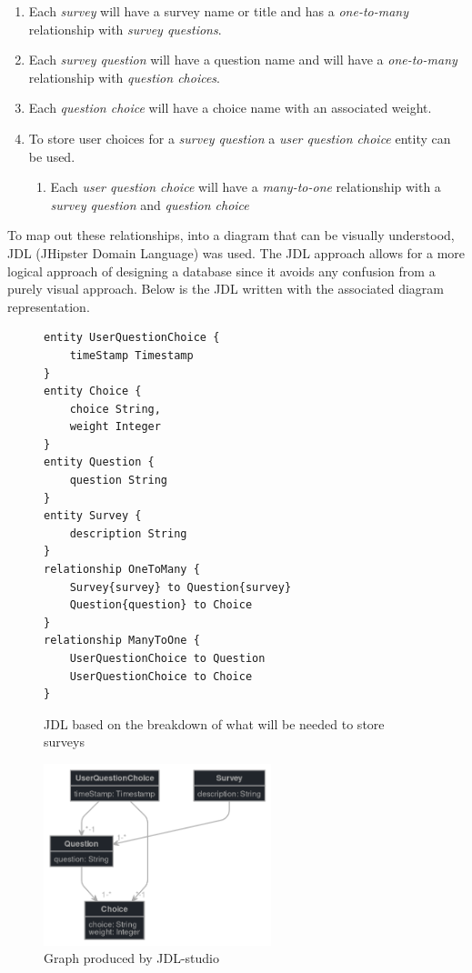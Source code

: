 \begin{enumerate}
    \item Each \textit{survey} will have a survey name or title and has a \textit{one-to-many} relationship with \textit{survey questions}.
    \item Each \textit{survey question} will have a question name and will have a \textit{one-to-many} relationship with \textit{question choices}.
    \item Each \textit{question choice} will have a choice name with an associated weight.
    \item To store user choices for a \textit{survey question} a \textit{user question choice} entity can be used.
        \begin{enumerate}
            \item Each \textit{user question choice} will have a \textit{many-to-one} relationship with a \textit{survey question} and \textit{question choice}
        \end{enumerate}
\end{enumerate}

To map out these relationships, into a diagram that can be visually understood, JDL (JHipster Domain Language) was used.
The JDL approach allows for a more logical approach of designing a database since it avoids any confusion from a purely visual approach.
Below is the JDL written with the associated diagram representation.

\begin{figure}[ht]
    \centering
    \begin{lstlisting}[language=JDL]
entity UserQuestionChoice {
	timeStamp Timestamp
}
entity Choice {
	choice String,
    weight Integer
}
entity Question {
	question String
}
entity Survey {
	description String
}
relationship OneToMany {
    Survey{survey} to Question{survey}
	Question{question} to Choice
}
relationship ManyToOne {
    UserQuestionChoice to Question
    UserQuestionChoice to Choice
}
    \end{lstlisting}
    \caption{JDL based on the breakdown of what will be needed to store surveys}
\end{figure}

\clearpage
\begin{figure}[ht]
    \centering
    \includegraphics[width=250px]{images/jhipster-jdl.png}
    \caption{Graph produced by JDL-studio}
    \label{survey-jdl-graph}
\end{figure}

